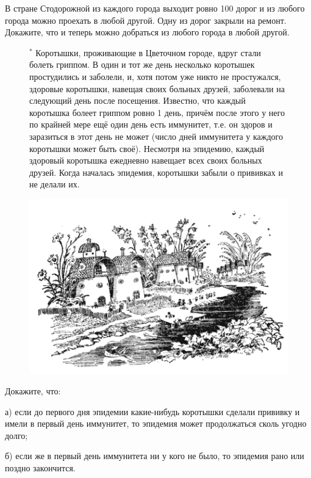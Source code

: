 \begin{thm}
    В стране Стодорожной из каждого города выходит ровно 100 дорог и из любого города можно проехать в любой другой. Одну из дорог закрыли на ремонт. Докажите, что и теперь можно добраться из любого города в любой другой.
\end{thm}

{\setlength{\intextsep}{2pt}
\begin{figure}[h]
\begin{minipage}{0.62\linewidth}\setlength{\parindent}{1.5em}
\begin{thm} $^*$
    Коротышки, проживающие в Цветочном городе, вдруг стали болеть гриппом. В один и тот же день несколько коротышек простудились и заболели, и, хотя потом уже никто не простужался, здоровые коротышки, навещая своих больных друзей, заболевали на следующий день после посещения. Известно, что каждый коротышка болеет гриппом ровно 1 день, причём после этого у него по крайней мере ещё один день есть иммунитет, т.е. он здоров и заразиться в этот день не может (число дней иммунитета у каждого коротышки может быть своё). Несмотря на эпидемию, каждый здоровый коротышка ежедневно навещает всех своих больных друзей. Когда началась эпидемия, коротышки забыли о прививках и не делали их.
\end{thm}
\end{minipage}
\hfill
\begin{minipage}{0.37\linewidth}
    \includegraphics[width=1\columnwidth]{img/houses.png}
\end{minipage}
\end{figure}}
Докажите, что:
\par
а) если до первого дня эпидемии какие-нибудь коротышки сделали прививку и имели в первый день иммунитет, то эпидемия может продолжаться сколь угодно долго;
\par
б) если же в первый день иммунитета ни у кого не было, то эпидемия рано или поздно закончится.

